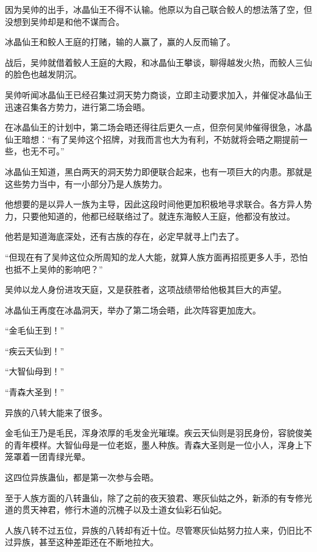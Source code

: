 
\begin{this_body}



因为吴帅的出手，冰晶仙王不得不认输。他原以为自己联合鲛人的想法落了空，但没想到吴帅却是和他不谋而合。

冰晶仙王和鲛人王庭的打赌，输的人赢了，赢的人反而输了。

战后，吴帅就借着鲛人王庭的大殿，和冰晶仙王攀谈，聊得越发火热，而鲛人三仙的脸色也越发阴沉。

吴帅听闻冰晶仙王已经召集过洞天势力商谈，立即主动要求加入，并催促冰晶仙王迅速召集各方势力，进行第二场会晤。

在冰晶仙王的计划中，第二场会晤还得往后更久一点，但奈何吴帅催得很急，冰晶仙王暗想：“有了吴帅这个招牌，对我而言也大为有利，不妨就将会晤之期提前一些，也无不可。”

冰晶仙王知道，黑白两天的洞天势力即便联合起来，也有一项巨大的内患。那就是这些势力当中，有一小部分乃是人族势力。

他想要的是以异人一族为主导，因此这段时间他更加积极地寻求联合。各方异人势力，只要他知道的，他都已经联络过了。就连东海鲛人王庭，他都没有放过。

他若是知道海底深处，还有古族的存在，必定早就寻上门去了。

“但现在有了吴帅这位众所周知的龙人大能，就算人族方面再招揽更多人手，恐怕也抵不上吴帅的影响吧？”

吴帅以龙人身份进攻天庭，又是获胜者，这项战绩带给他极其巨大的声望。

冰晶仙王再度在冰晶洞天，举办了第二场会晤，此次阵容更加庞大。

“金毛仙王到！”

“疾云天仙到！”

“大智仙母到！”

“青森大圣到！”

异族的八转大能来了很多。

金毛仙王乃是毛民，浑身浓厚的毛发金光璀璨。疾云天仙则是羽民身份，容貌俊美的青年模样。大智仙母是一位老妪，墨人种族。青森大圣则是一位小人，浑身上下笼罩着一团青绿光晕。

这四位异族蛊仙，都是第一次参与会晤。

至于人族方面的八转蛊仙，除了之前的夜天狼君、寒灰仙姑之外，新添的有专修光道的贯天神君，修行木道的沉槐子以及土道女仙彩石仙妃。

人族八转不过五位，异族的八转却有近十位。尽管寒灰仙姑努力拉人来，仍旧比不过异族，甚至这种差距还在不断地拉大。


\end{this_body}
